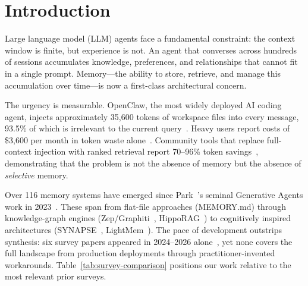 \section{Introduction}
\label{sec:introduction}

Large language model (LLM) agents face a fundamental constraint: the
context window is finite, but experience is not. An agent that
converses across hundreds of sessions accumulates knowledge,
preferences, and relationships that cannot fit in a single prompt.
Memory---the ability to store, retrieve, and manage this accumulation
over time---is now a first-class architectural concern.

The urgency is measurable. OpenClaw, the most widely deployed AI coding
agent, injects approximately 35,600 tokens of workspace files into
every message, 93.5\% of which is irrelevant to the current
query~\cite{openclaw9157}. Heavy users report costs of \$3,600 per
month in token waste alone~\cite{zilliz2026b}. Community tools that
replace full-context injection with ranked retrieval report 70--96\%
token savings~\cite{levine2026}, demonstrating that the problem is not
the absence of memory but the absence of \emph{selective} memory.

Over 116 memory systems have emerged since Park~\etal's seminal
Generative Agents work in 2023~\cite{park2023generative}. These span
from flat-file approaches (MEMORY.md) through knowledge-graph engines
(Zep/Graphiti~\cite{dempsey2025graphiti},
HippoRAG~\cite{gutierrez2024hipporag}) to cognitively inspired
architectures (SYNAPSE~\cite{jiang2026synapse},
LightMem~\cite{fang2025lightmem}). The pace of development outstrips
synthesis: six survey papers appeared in 2024--2026
alone~\cite{sumers2024coala, gao2023rag, zhang2024survey, hu2025memory,
wu2025memory, du2025memory}, yet none covers the full landscape from
production deployments through practitioner-invented workarounds.
Table~\ref{tab:survey-comparison} positions our work relative to the most
relevant prior surveys.

